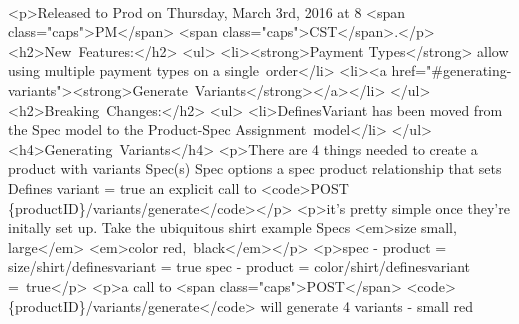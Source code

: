 \documentclass{memoir}%
\begin{document}
\paragraph*{}%
<p>Released to Prod on Thursday, March 3rd, 2016 at 8 <span class="caps">PM</span> <span class="caps">CST</span>.</p>\newline%
<h2>New~Features:</h2>\newline%
<ul>\newline%
<li><strong>Payment Types</strong> allow using multiple payment types on a single~order</li>\newline%
<li><a href="\#generating{-}variants"><strong>Generate~Variants</strong></a></li>\newline%
</ul>\newline%
<h2>Breaking~Changes:</h2>\newline%
<ul>\newline%
<li>DefinesVariant has been moved from the Spec model to the Product{-}Spec Assignment~model</li>\newline%
</ul>\newline%
<h4>Generating~Variants</h4>\newline%
<p>There are 4 things needed to create a product with variants\newline%
Spec(s)\newline%
Spec options\newline%
a spec product relationship that sets Defines variant = true\newline%
an explicit call to \newline%
<code>POST \{productID\}/variants/generate</code></p>\newline%
<p>it’s pretty simple once they’re initally set up. Take the ubiquitous shirt example\newline%
Specs \newline%
<em>size small, large</em>\newline%
<em>color red,~black</em></p>\newline%
<p>spec {-} product = size/shirt/definesvariant = true\newline%
spec {-} product = color/shirt/definesvariant =~true</p>\newline%
<p>a call to <span class="caps">POST</span>\newline%
<code>\{productID\}/variants/generate</code>\newline%
will generate 4 variants\newline%
{-} small red\newline%
\end{document}
